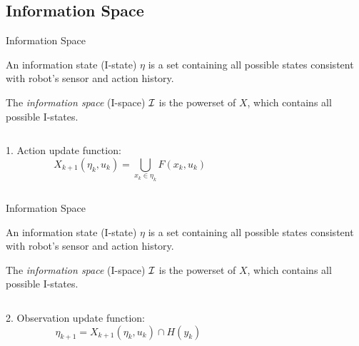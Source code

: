 \documentclass[10pt]{beamer}
\begin{document}
\subsection[I-Space]{Information Space}
\begin{frame}{Information Space}
  \begin{definition}
  \small{An information state (I-state) $\eta$ is a set containing all possible
    states consistent with robot's sensor and action history.}
  \end{definition}
  \begin{definition}
  \small{The \emph{information space} (I-space) $\mathcal{I}$ is the
  powerset of $X$, which contains all possible I-states.}
  \end{definition}
  \begin{columns}
    \begin{column}{0.4\textwidth}
       1. Action update function:
       $$X_{k+1}(\eta_{k}, u_k) =  \bigcup_{x_k \in \eta_k} F(x_k, u_k)$$
     \end{column}
    \begin{column}{0.5\textwidth}
      
    \end{column}
  \end{columns}
\end{frame}

\begin{frame}{Information Space}
  \begin{definition}
    \small{An information state (I-state) $\eta$ is a set containing all possible
      states consistent with robot's sensor and action history.}
  \end{definition}
  \begin{definition}
    \small{The \emph{information space} (I-space) $\mathcal{I}$ is the
      powerset of $X$, which contains all possible I-states.}
  \end{definition}
  \begin{columns}
    \begin{column}{0.4\textwidth}
      2. Observation update function:
      $$\eta_{k+1} =   X_{k+1}(\eta_{k}, u_k) \cap H(y_{k})$$
    \end{column}
    \begin{column}{0.5\textwidth}
      
    \end{column}
  \end{columns}  
 \end{frame}
\end{document}
